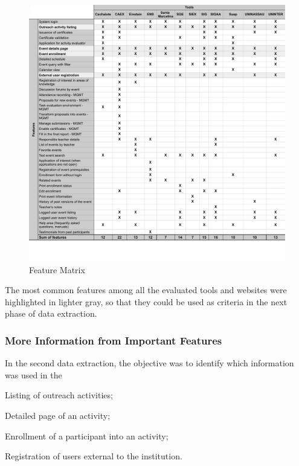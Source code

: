 \begin{figure}[htb]
  \caption{Feature Matrix}\label{fig:gl-matrix}
  \begin{center}
    \includegraphics[width=16cm]{img/functionality-matrix.pdf}
  \end{center}
\end{figure}

The most common features among all the evaluated tools and websites were highlighted in lighter gray, so that they could be used as criteria in the next phase of data extraction.

\subsubsection{More Information from Important Features}\label{sec:gl-data-extraction-2}

In the second data extraction, the objective was to identify which information was used in the
\begin{inparaenum}[(i)]
  \item Listing of outreach activities;
  \item Detailed page of an activity;
  \item Enrollment of a participant into an activity;
  \item Registration of users external to the institution.
\end{inparaenum}

